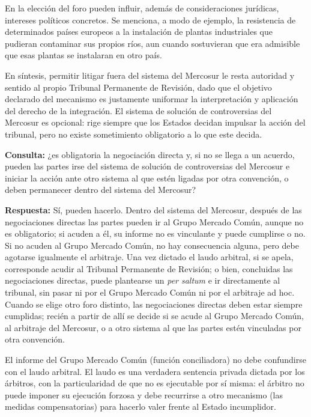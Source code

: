 \documentclass[12pt,oneside]{book}
\begin{document}
En la elección del foro pueden influir, además de consideraciones jurídicas, intereses políticos concretos. Se menciona, a modo de ejemplo, la resistencia de determinados países europeos a la instalación de plantas industriales que pudieran contaminar sus propios ríos, aun cuando sostuvieran que era admisible que esas plantas se instalaran en otro país.

En síntesis, permitir litigar fuera del sistema del Mercosur le resta autoridad y sentido al propio Tribunal Permanente de Revisión, dado que el objetivo declarado del mecanismo es justamente uniformar la interpretación y aplicación del derecho de la integración. El sistema de solución de controversias del Mercosur es opcional: rige siempre que los Estados decidan impulsar la acción del tribunal, pero no existe sometimiento obligatorio a lo que este decida.

\begin{note}
\textbf{Consulta:} ¿es obligatoria la negociación directa y, si no se llega a un acuerdo, pueden las partes irse del sistema de solución de controversias del Mercosur e iniciar la acción ante otro sistema al que estén ligadas por otra convención, o deben permanecer dentro del sistema del Mercosur?

\textbf{Respuesta:} Sí, pueden hacerlo. Dentro del sistema del Mercosur, después de las negociaciones directas las partes pueden ir al Grupo Mercado Común, aunque no es obligatorio; si acuden a él, su informe no es vinculante y puede cumplirse o no. Si no acuden al Grupo Mercado Común, no hay consecuencia alguna, pero debe agotarse igualmente el arbitraje. Una vez dictado el laudo arbitral, si se apela, corresponde acudir al Tribunal Permanente de Revisión; o bien, concluidas las negociaciones directas, puede plantearse un \textit{per saltum} e ir directamente al tribunal, sin pasar ni por el Grupo Mercado Común ni por el arbitraje ad hoc. Cuando se elige otro foro distinto, las negociaciones directas deben estar siempre cumplidas; recién a partir de allí se decide si se acude al Grupo Mercado Común, al arbitraje del Mercosur, o a otro sistema al que las partes estén vinculadas por otra convención.
\end{note}

\begin{important}
El informe del Grupo Mercado Común (función conciliadora) no debe confundirse con el laudo arbitral. El laudo es una verdadera sentencia privada dictada por los árbitros, con la particularidad de que no es ejecutable por sí misma: el árbitro no puede imponer su ejecución forzosa y debe recurrirse a otro mecanismo (las medidas compensatorias) para hacerlo valer frente al Estado incumplidor.
\end{important}
\end{document}
